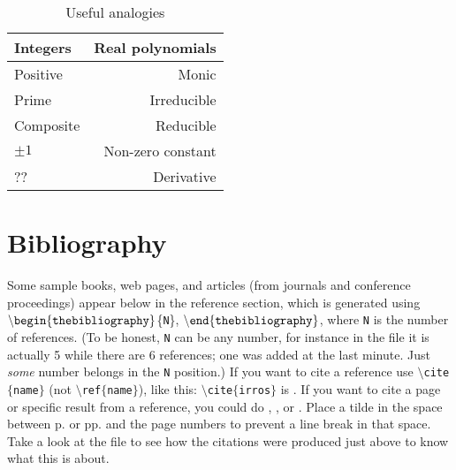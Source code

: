 \documentclass[12pt,letterpaper]{amsart}
\newcommand{\sm}{\setminus}
\newcommand{\pln}[1]{$\sm${\tt #1}}
\newcommand{\bgn}[1]{$\tt {\sm}begin\{#1\}$}
\newcommand{\nd}[1]{$\tt {\sm}end\{#1\}$}
\theoremstyle{plain}
\theoremstyle{definition}
\numberwithin{equation}{section}
\begin{document}
\begin{table}[ht]
\begin{center}
\begin{tabular}{|l|||r|} \hline 
Integers & Real polynomials \\ \hline
Positive & Monic \\
Prime & Irreducible \\
Composite & Reducible \\
$\pm 1$ & Non-zero constant \\ 
?? & Derivative \\ \hline
\end{tabular}
\caption{Useful analogies}\label{tab2}
\end{center}
\end{table}



\section{Bibliography}

Some sample books, web pages, and articles (from journals and conference 
proceedings) appear below in the reference section, which is generated using 
\bgn{thebibliography}\{{\tt N}\},
\nd{thebibliography}, 
where {\tt N} 
is the number of references.  (To be honest, 
{\tt N} can be any number,  
for instance in the file 
it is actually 5 while there are 6 references; one was added 
at the last minute.  Just {\it some} number belongs in the 
{\tt N} position.)
If you want to cite a reference use 
\pln{cite}$\{${\tt name}$\}$ (not \pln{ref}$\{${\tt name}$\}$), 
like this: \pln{cite}$\{${\tt irros}$\}$ is \cite{irros}.  If you 
want to cite a page or specific result from a reference, you could do 
\cite[p.~340]{irros}, \cite[pp.~340--342]{irros}, or 
\cite[Theorem 20.1.1]{irros}. 
Place a tilde in the space between p. or pp. and the page 
numbers to prevent a line break in that space.  Take a look at the file 
to see how the citations were produced just above to know what this is about.
\end{document}
